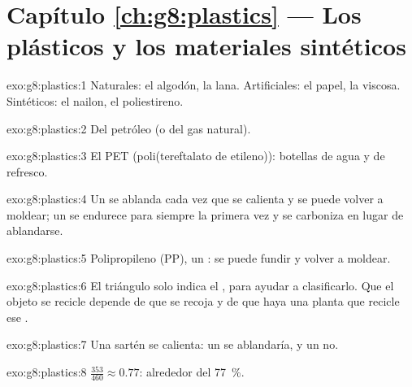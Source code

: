 \section*{Capítulo \ref{ch:g8:plastics} --- Los plásticos y los materiales sintéticos}

\begin{solution}{exo:g8:plastics:1}
Naturales: el algodón, la lana. Artificiales: el papel, la viscosa.
Sintéticos: el nailon, el poliestireno.
\end{solution}

\begin{solution}{exo:g8:plastics:2}
Del petróleo (o del gas natural).
\end{solution}

\begin{solution}{exo:g8:plastics:3}
El PET (poli(tereftalato de etileno)): botellas de agua y de refresco.
\end{solution}

\begin{solution}{exo:g8:plastics:4}
Un  se ablanda cada vez que se calienta y se puede volver
a moldear; un  se endurece para siempre la primera vez y se
carboniza en lugar de ablandarse.
\end{solution}

\begin{solution}{exo:g8:plastics:5}
Polipropileno (PP), un : se puede fundir y volver a
moldear.
\end{solution}

\begin{solution}{exo:g8:plastics:6}
El triángulo solo indica el , para ayudar a clasificarlo. Que el
objeto se recicle depende de que se recoja y de que haya una planta que
recicle ese .
\end{solution}

\begin{solution}{exo:g8:plastics:7}
Una sartén se calienta: un  se ablandaría, y un
 no.
\end{solution}

\begin{solution}{exo:g8:plastics:8}
$\frac{353}{460} \approx 0.77$: alrededor del \qty{77}{\percent}.
\end{solution}


